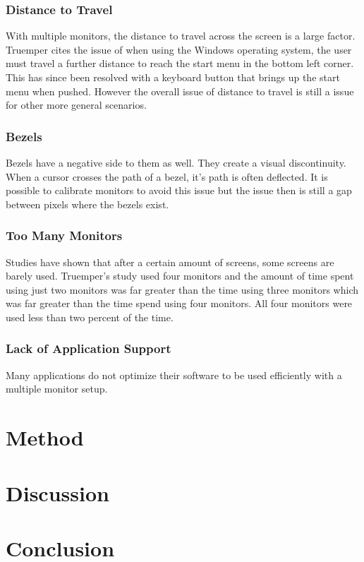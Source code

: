 \documentclass[a4paper]{article}
\begin{document}
\subsubsection{Distance to Travel}
With multiple monitors, the distance to travel across the screen is a large factor. Truemper cites the issue of when using the Windows operating system, the user must travel a further distance to reach the start menu in the bottom left corner.\cite{Truemper} This has since been resolved with a keyboard button that brings up the start menu when pushed. However the overall issue of distance to travel is still a issue for other more general scenarios.\cite{Truemper}

\subsubsection{Bezels}
Bezels have a negative side to them as well. They create a visual discontinuity.  When a cursor crosses the path of a bezel, it's path is often deflected. It is possible to calibrate monitors to avoid this issue but the issue then is still a gap between pixels where the bezels exist.\cite{Truemper} 

\subsubsection{Too Many Monitors}
Studies have shown that after a certain amount of screens, some screens are barely used. Truemper's study used four monitors and the amount of time spent using just two monitors was far greater than the time using three monitors which was far greater than the time spend using four monitors. All four monitors were used less than two percent of the time.\cite{Truemper}

\subsubsection{Lack of Application Support}
Many applications do not optimize their software to be used efficiently with a multiple monitor setup.\cite{Grudin}


\section{Method}

\section{Discussion}
\section{Conclusion}



\end{document}
